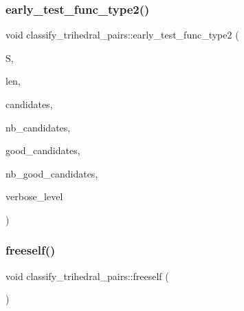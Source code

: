 \mbox{\label{classclassify__trihedral__pairs_a81a66db6705ac1c6e4fd1e9e9fa94cdb}} 
\subsubsection{\texorpdfstring{early\+\_\+test\+\_\+func\+\_\+type2()}{early\_test\_func\_type2()}}
{\footnotesize\ttfamily void classify\+\_\+trihedral\+\_\+pairs\+::early\+\_\+test\+\_\+func\+\_\+type2 (\begin{DoxyParamCaption}\item[{\mbox{\hyperlink{galois_8h_a09fddde158a3a20bd2dcadb609de11dc}{I\+NT}} $\ast$}]{S,  }\item[{\mbox{\hyperlink{galois_8h_a09fddde158a3a20bd2dcadb609de11dc}{I\+NT}}}]{len,  }\item[{\mbox{\hyperlink{galois_8h_a09fddde158a3a20bd2dcadb609de11dc}{I\+NT}} $\ast$}]{candidates,  }\item[{\mbox{\hyperlink{galois_8h_a09fddde158a3a20bd2dcadb609de11dc}{I\+NT}}}]{nb\+\_\+candidates,  }\item[{\mbox{\hyperlink{galois_8h_a09fddde158a3a20bd2dcadb609de11dc}{I\+NT}} $\ast$}]{good\+\_\+candidates,  }\item[{\mbox{\hyperlink{galois_8h_a09fddde158a3a20bd2dcadb609de11dc}{I\+NT}} \&}]{nb\+\_\+good\+\_\+candidates,  }\item[{\mbox{\hyperlink{galois_8h_a09fddde158a3a20bd2dcadb609de11dc}{I\+NT}}}]{verbose\+\_\+level }\end{DoxyParamCaption})}

\mbox{\label{classclassify__trihedral__pairs_a961a7d8228b1ab817d34b3e890186506}} 
\subsubsection{\texorpdfstring{freeself()}{freeself()}}
{\footnotesize\ttfamily void classify\+\_\+trihedral\+\_\+pairs\+::freeself (\begin{DoxyParamCaption}{ }\end{DoxyParamCaption})}

